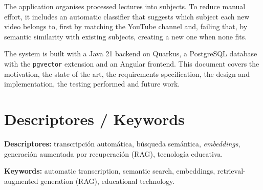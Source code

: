 The application organises processed lectures into subjects. To reduce manual effort, it
includes an automatic classifier that suggests which subject each new video belongs to, first
by matching the YouTube channel and, failing that, by semantic similarity with existing
subjects, creating a new one when none fits.

The system is built with a Java 21 backend on Quarkus, a PostgreSQL database with the
\texttt{pgvector} extension and an Angular frontend. This document covers the motivation,
the state of the art, the requirements specification, the design and implementation, the
testing performed and future work.

\vspace{1cm}
\section*{Descriptores / Keywords}

\noindent\textbf{Descriptores:} transcripción automática, búsqueda semántica, \textit{embeddings},
generación aumentada por recuperación (RAG), tecnología educativa.

\noindent\textbf{Keywords:} automatic transcription, semantic search, embeddings,
retrieval-augmented generation (RAG), educational technology.
